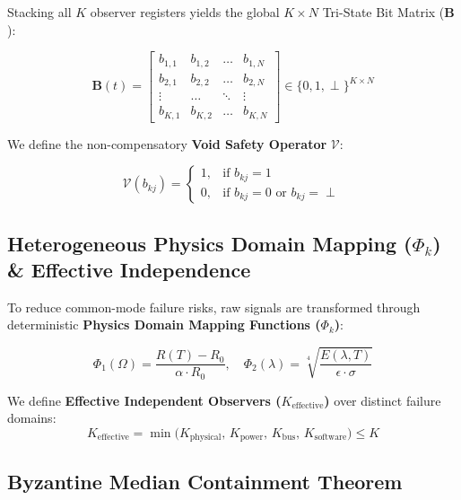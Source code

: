 \documentclass[conference]{IEEEtran}
\begin{document}
Stacking all $K$ observer registers yields the global $K \times N$ Tri-State Bit Matrix ($\mathbf{B}$):

\begin{equation}
\mathbf{B}(t) = \begin{bmatrix}
b_{1,1} & b_{1,2} & \dots & b_{1,N} \\
b_{2,1} & b_{2,2} & \dots & b_{2,N} \\
\vdots & \dots & \ddots & \vdots \\
b_{K,1} & b_{K,2} & \dots & b_{K,N}
\end{bmatrix} \in \{0, 1, \perp\}^{K \times N}
\end{equation}

We define the non-compensatory \textbf{Void Safety Operator} $\mathcal{V}$:

\begin{equation}
\mathcal{V}(b_{kj}) = \begin{cases} 1, & \text{if } b_{kj} = 1 \\ 0, & \text{if } b_{kj} = 0 \text{ or } b_{kj} = \perp \end{cases}
\end{equation}

\subsection{Heterogeneous Physics Domain Mapping ($\Phi_k$) \& Effective Independence}
To reduce common-mode failure risks, raw signals are transformed through deterministic \textbf{Physics Domain Mapping Functions ($\Phi_k$)}:

\begin{equation}
\Phi_1(\Omega) = \frac{R(T) - R_0}{\alpha \cdot R_0}, \quad \Phi_2(\lambda) = \sqrt[4]{\frac{E(\lambda, T)}{\epsilon \cdot \sigma}}
\end{equation}

We define \textbf{Effective Independent Observers ($K_{\text{effective}}$)} over distinct failure domains:
\begin{equation}
K_{\text{effective}} = \min\Big( K_{\text{physical}}, \, K_{\text{power}}, \, K_{\text{bus}}, \, K_{\text{software}} \Big) \le K
\end{equation}

\subsection{Byzantine Median Containment Theorem}
\end{document}
